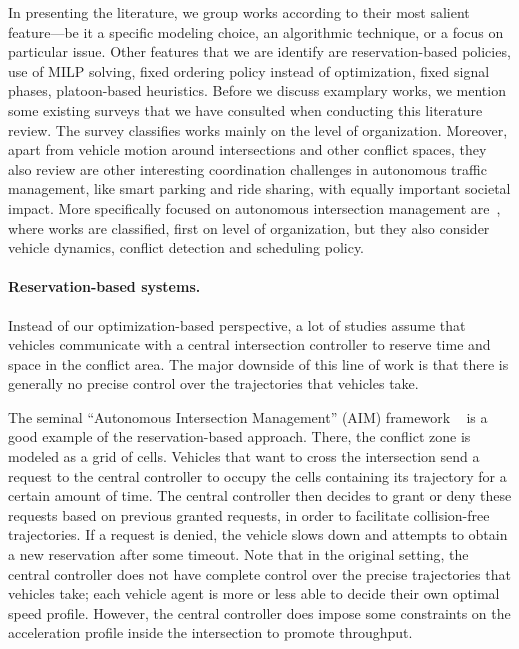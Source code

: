 \documentclass[a4paper]{report}
\theoremstyle{definition}
\theoremstyle{plain}
\begin{document}
In presenting the literature, we group works according to their most salient
feature---be it a specific modeling choice, an algorithmic technique, or a focus
on particular issue.
%
Other features that we are identify are reservation-based policies, use of MILP
solving, fixed ordering policy instead of optimization, fixed signal phases,
platoon-based heuristics.
%
Before we discuss examplary works, we mention some existing surveys that we have
consulted when conducting this literature review.
%
The survey \cite{marianiCoordinationAutonomousVehicles2022} classifies works
mainly on the level of organization. Moreover, apart from vehicle motion around
intersections and other conflict spaces, they also review are other interesting
coordination challenges in autonomous traffic management, like smart parking and
ride sharing, with equally important societal impact.
%
More specifically focused on autonomous intersection management
are~\cite{khayatianSurveyIntersectionManagement2020}, where works are
classified, first on level of organization, but they also consider vehicle
dynamics, conflict detection and scheduling policy.


\paragraph{Reservation-based systems.}

Instead of our optimization-based perspective, a lot of studies assume that
vehicles communicate with a central intersection controller to reserve time and
space in the conflict area.
%
The major downside of this line of work is that there is generally no precise
control over the trajectories that vehicles take.

The seminal ``Autonomous Intersection Management'' (AIM) framework
~\cite{dresnerMultiagentTrafficManagement2004,dresnerMultiagentApproachAutonomous2008}
is a good example of the reservation-based approach. There, the conflict zone is
modeled as a grid of cells. Vehicles that want to cross the intersection send a
request to the central controller to occupy the cells containing its trajectory
for a certain amount of time. The central controller then decides to grant or
deny these requests based on previous granted requests, in order to facilitate
collision-free trajectories. If a request is denied, the vehicle slows down and
attempts to obtain a new reservation after some timeout.
%
Note that in the original setting, the central controller does not have complete
control over the precise trajectories that vehicles take; each vehicle agent is
more or less able to decide their own optimal speed profile.
%
However, the central controller does impose some constraints on the acceleration
profile inside the intersection to promote throughput.
\end{document}
